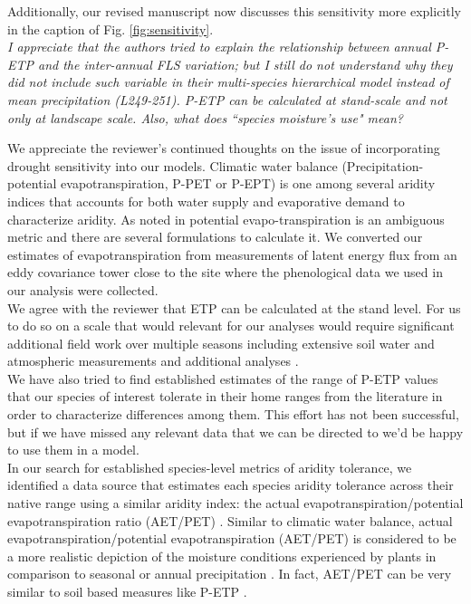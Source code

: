 \documentclass{article}[11pt]
\begin{document}
Additionally, our revised manuscript now discusses this sensitivity more explicitly in the caption of Fig. \ref{fig:sensitivity}.\\


\textit{I appreciate that the authors tried to explain the relationship between annual P-ETP and the inter-annual FLS variation; but I still do not understand why they did not include such variable in their multi-species hierarchical model instead of mean precipitation (L249-251). P-ETP can be calculated at stand-scale and not only at landscape scale. Also, what does ``species moisture's use" mean?}

We appreciate the reviewer's continued thoughts on the issue of incorporating drought sensitivity into our models. Climatic water balance (Precipitation-potential evapotranspiration, P-PET or P-EPT) is one among several aridity indices that accounts for both water supply and evaporative demand to characterize aridity. As noted in \citet{Speich:2019aa} potential evapo-transpiration is an ambiguous metric and there are several formulations to calculate it. We converted our estimates of evapotranspiration from measurements of latent energy flux \citep{Knauer2018} from an eddy covariance tower close to the site where the phenological data we used in our analysis were collected.\\

We agree with the reviewer that ETP can be calculated at the stand level. For us to do so on a scale that would relevant for our analyses would require significant additional field work over multiple seasons including extensive soil water and atmospheric measurements and additional analyses \citep{GARNIER:1952aa,Allan:1998aa}.\\ 

We have also tried to find established estimates of the range of P-ETP values that our species of interest tolerate in their home ranges from the literature in order to characterize differences among them. This effort has not been successful, but if we have missed any relevant data that we can be directed to we'd be happy to use them in a model.\\ 

In our search for established species-level metrics of aridity tolerance, we identified a data source that estimates each species aridity tolerance across their native range using a similar aridity index: the actual evapotranspiration/potential evapotranspiration ratio (AET/PET) \citep{Thomspson2012}. Similar to climatic water balance, actual evapotranspiration/potential evapotranspiration (AET/PET) is considered to be a more realistic depiction of the moisture conditions experienced by plants in comparison to seasonal or annual precipitation \citep{Thomspson2012}. In fact, AET/PET can be very similar to soil based measures like  P-ETP \citep{Speich:2019aa}.\\
\end{document}
